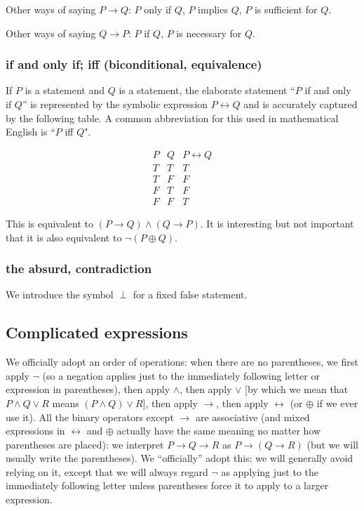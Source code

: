\documentclass[12pt]{article}
\begin{document}
Other ways of saying $P \rightarrow Q$: $P$ only if $Q$, $P$ implies
$Q$, $P$ is sufficient for $Q$.

Other ways of saying $Q \rightarrow P$: $P$ if $Q$, $P$ is necessary
for $Q$.

\subsubsection{if and only if; iff (biconditional, equivalence)}

If $P$ is a statement and $Q$ is a statement, the elaborate statement
``$P$ if and only if $Q$'' is represented by the symbolic expression
$P \leftrightarrow Q$ and is accurately captured by the following
table.  A common abbreviation for this used in mathematical English is
``$P$ iff $Q$".

$$\begin{array}{c|c|c} P  & Q & P \leftrightarrow Q \\ \hline
                       T  & T &   T  \\
                       T  & F &   F  \\
                       F  & T &   F  \\
                       F  & F &   T \end{array}$$

This is equivalent to $(P \rightarrow Q) \wedge (Q \rightarrow P)$.
It is interesting but not important that it is also equivalent to
$\neg(P \oplus Q)$.

\subsubsection{the absurd, contradiction}

We introduce the symbol $\perp$ for a fixed false statement.

\subsection{Complicated expressions}

We officially adopt an order of operations: when there are no
parentheses, we first apply $\neg$ (so a negation applies just to the
immediately following letter or expression in parentheses), then apply
$\wedge$, then apply $\vee$ [by which we mean that $P \wedge Q \vee R$
means $(P \wedge Q) \vee R$], then apply $\rightarrow$, then apply
$\leftrightarrow$ (or $\oplus$ if we ever use it).  All the binary
operators except $\rightarrow$ are associative (and mixed expressions
in $\leftrightarrow$ and $\oplus$ actually have the same meaning no
matter how parentheses are placed): we interpret $P \rightarrow Q
\rightarrow R$ as $P \rightarrow (Q \rightarrow R)$ (but we will
usually write the parentheses).  We ``officially'' adopt this: we will
generally avoid relying on it, except that we will always regard
$\neg$ as applying just to the immediately following letter unless
parentheses force it to apply to a larger expression.
\end{document}
